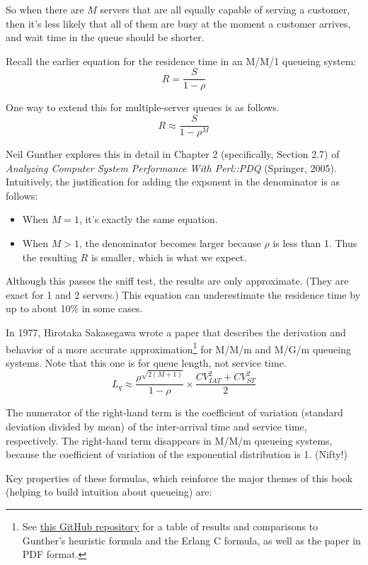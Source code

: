 \documentclass{vivid_layout_pdf}
\begin{document}
So when there are \( M \) servers that are all equally capable of serving a customer, then it's less likely that all of them are busy at the moment a customer arrives, and wait time in the queue should be shorter. 

Recall the earlier equation for the residence time in an M/M/1 queueing system:
\[
  R = \frac{S}{1 - \rho}
\]

One way to extend this for multiple-server queues is as follows.
\[
  R \approx \frac{S}{ 1-\rho^M }
\]

Neil Gunther explores this in detail in Chapter 2 (specifically, Section 2.7) of {\itshape Analyzing Computer System Performance With Perl::PDQ} (Springer, 2005). Intuitively, the justification for adding the exponent in the denominator is as follows:

\begin{itemize}
\item When \( M=1 \), it's exactly the same equation.
\item When \( M > 1 \), the denominator becomes larger because \( \rho \) is less than 1. Thus the resulting \( R \) is smaller, which is what we expect.
\end{itemize}

Although this passes the sniff test, the results are only approximate. (They are exact for 1 and 2 servers.) This equation can underestimate the residence time by up to about 10\% in some cases.

In 1977, Hirotaka Sakasegawa wrote a paper that describes the derivation and behavior of a more accurate approximation\footnote{See \href{https://github.com/VividCortex/approx-queueing-theory}{this GitHub repository} for a table of results and comparisons to Gunther's heuristic formula and the Erlang C formula, as well as the paper in PDF format.} for M/M/m and M/G/m queueing systems. Note that this one is for queue length, not service time.
\[
L_q \approx \frac{ \rho^{\sqrt{2(M+1)}} }{ 1-\rho} \times \frac {CV_{IAT}^2 + CV_{ST}^2}{2}
\]

The numerator of the right-hand term is the coefficient of variation (standard deviation divided by mean) of the inter-arrival time and service time, respectively. The right-hand term disappears in M/M/m queueing systems, because the coefficient of variation of the exponential distribution is 1. (Nifty!)

Key properties of these formulas, which reinforce the major themes of this book (helping to build intuition about queueing) are:
\end{document}
